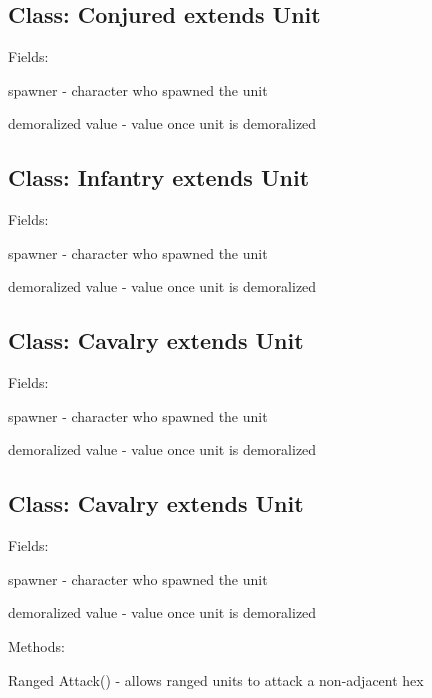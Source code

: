 \subsection*{Class: Conjured extends Unit}
\begin{al}
	\item[Fields:] \parbox{\textwidth}{spawner - character who spawned the unit}
    \item[] \parbox{\textwidth}{demoralized value - value once unit is demoralized}
\end{al}

\subsection*{Class: Infantry extends Unit}
\begin{al}
	\item[Fields:] \parbox{\textwidth}{spawner - character who spawned the unit}
    \item[] \parbox{\textwidth}{demoralized value - value once unit is demoralized}
\end{al}

		
\subsection*{Class: Cavalry extends Unit}
\begin{al}
	\item[Fields:] \parbox{\textwidth}{spawner - character who spawned the unit}
    \item[] \parbox{\textwidth}{demoralized value - value once unit is demoralized}
\end{al}

\subsection*{Class: Cavalry extends Unit}
\begin{al}
	\item[Fields:] \parbox{\textwidth}{spawner - character who spawned the unit}
    \item[] \parbox{\textwidth}{demoralized value - value once unit is demoralized}
	\item[Methods:] \parbox{\textwidth}{Ranged Attack() - allows ranged units to attack a non-adjacent hex}
\end{al}

